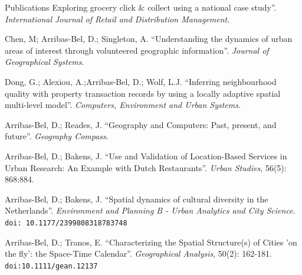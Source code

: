 \documentclass[12pt,2up]{article}
\begin{document}
\begin{cv}{}
\begin{cvlist}{Publications}
    Exploring grocery click \& collect using a national case study''.
    \emph{International Journal of Retail and Distribution Management}.
\item[] 
    Chen, M; Arribas-Bel, D.; Singleton, A. ``Understanding the
    dynamics of urban areas of interest through volunteered geographic
    information''. \emph{Journal of Geographical Systems}.
\item[] 
    Dong, G.; Alexiou, A.;Arribas-Bel, D.; Wolf, L.J. ``Inferring
    neighbourhood quality with property transaction records by using a locally
    adaptive spatial multi-level model''. 
    \emph{Computers, Environment and Urban Systems}.
\item[\textit{2018}] 
    Arribas-Bel, D.; Reades, J. ``Geography and Computers: Past, present, and future''.
    \emph{Geography Compass}.
\item[] 
    Arribas-Bel, D.; Bakens, J. ``Use and Validation of Location-Based
    Services in Urban Research: An Example with Dutch Restaurants''.
    \emph{Urban Studies}, 56(5): 868:884.
\item[] 
    Arribas-Bel, D.; Bakens, J. ``Spatial dynamics of cultural diversity 
    in the Netherlands''.
    \emph{Environment and Planning B - Urban Analytics and City Science}.
    \texttt{doi: 10.1177/2399808318783748}
\item[\textit{2017}] 
Arribas-Bel, D.; Tranos, E. ``Characterizing the Spatial Structure(s) of
Cities 'on the fly': the Space-Time Calendar''.
\emph{Geographical Analysis}, 50(2): 162-181. \texttt{doi:10.1111/gean.12137}


\end{cvlist}
\end{cv}
\end{document}
